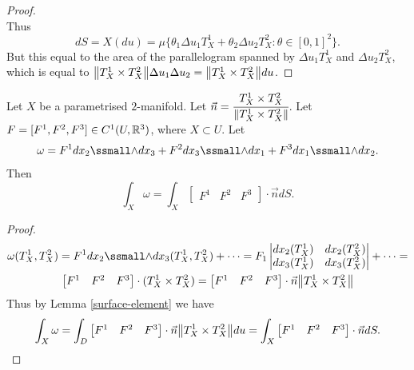 \documentclass[main.tex]{subfiles}
\begin{document}
\begin{theorem}
\begin{proof}
\begin{equation}
\end{equation}
Thus
\begin{equation}
dS = X(du) = \mu\{\theta_1\Delta u_1 T_X^1 + \theta_2\Delta u_2 T_X^2:\theta\in[0,1]^2\}.
\end{equation}
But this equal to the area of the parallelogram spanned by $\Delta u_1 T_X^1$ and $\Delta u_2 T_X^2$, which is equal to $\norm{T^1_X\times T^2_X}\Delta u_1\Delta u_2 = \norm{T^1_X\times T^2_X}du$.
\end{proof}
\begin{example}
\label{form2normal-surface}
Let $X$ be a parametrised $2$-manifold. Let $\vec{n} = \cfrac{T^1_X\times T^2_X}{\norm{T^1_X\times T^2_X}}$. Let $F=[F^1, F^2, F^3]\in C^1(U, \mathbb{R}^3)$, where $X\subset U$. Let 
\begin{equation}
\omega = F^1 dx_2 \form dx_3 + F^2 dx_3\form dx_1 + F^3 dx_1\form dx_2. 
\end{equation}
Then
\begin{equation}
\int_X  \omega = \int_X
\begin{bmatrix}
F^1 & F^2 & F^3
\end{bmatrix} \cdot \vec{n} dS.
\end{equation}
\end{example}
\begin{proof}
\begin{multline}
\omega(T^1_X, T^2_X) = F^1 dx_2 \form dx_3(T^1_X, T^2_X) + \dots = 
F_1
\begin{vmatrix}
dx_2(T_X^1) & dx_2(T_X^2) \\
dx_3(T_X^1) & dx_3(T_X^2) \\  
\end{vmatrix} + \dots = \\
\begin{bmatrix}
F^1 & F^2 & F^3
\end{bmatrix} \cdot (T_X^1\times T_X^2) = 
\begin{bmatrix}
F^1 & F^2 & F^3
\end{bmatrix} \cdot \vec{n} \norm{T_X^1\times T_X^2} 
\end{multline}
Thus by Lemma \ref{surface-element} we have
\begin{equation}
\int_X  \omega = \int_D \begin{bmatrix}
F^1 & F^2 & F^3
\end{bmatrix} \cdot \vec{n} \norm{T_X^1\times T_X^2} du
= \int_X 
\begin{bmatrix}
F^1 & F^2 & F^3
\end{bmatrix} \cdot \vec{n} dS.
\end{equation}
\end{proof}
\end{theorem}
\end{document}
